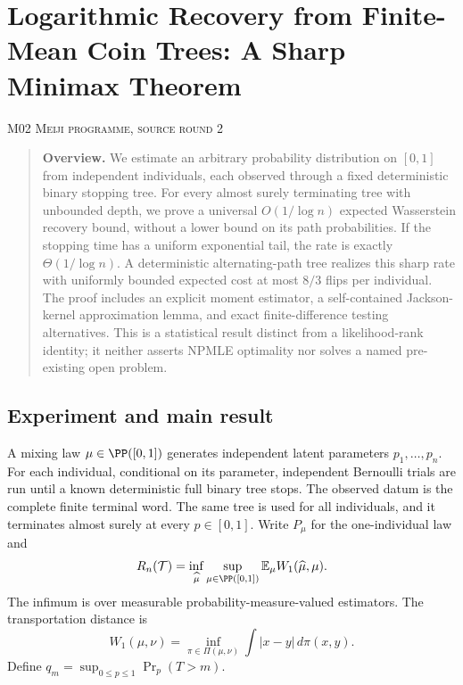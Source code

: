 \documentclass[11pt,a4paper]{article}
\theoremstyle{definition}\newtheorem{definition}[theorem]{Definition}
\theoremstyle{remark}\newtheorem{remark}[theorem]{Remark}
\newcommand{\E}{\mathbb E}\newcommand{\one}{\mathbf 1}\newcommand{\1}{\mathbf 1}
\numberwithin{equation}{section}
\begin{document}
\clearpage
\section[M02 --- Logarithmic Recovery from Finite-Mean Coin Trees: A Sharp Minimax Theorem]{Logarithmic Recovery from Finite-Mean Coin Trees: A Sharp Minimax Theorem}\label{contrib-M02}
\noindent\textsc{M02 \quad Meiji programme, source round 2}\par\medskip


\begin{quote}\small\textbf{Overview.} We estimate an arbitrary probability distribution on $[0,1]$ from independent individuals, each observed through a fixed deterministic binary stopping tree. For every almost surely terminating tree with unbounded depth, we prove a universal $O(1/\log n)$ expected Wasserstein recovery bound, without a lower bound on its path probabilities. If the stopping time has a uniform exponential tail, the rate is exactly $\Theta(1/\log n)$. A deterministic alternating-path tree realizes this sharp rate with uniformly bounded expected cost at most $8/3$ flips per individual. The proof includes an explicit moment estimator, a self-contained Jackson-kernel approximation lemma, and exact finite-difference testing alternatives. This is a statistical result distinct from a likelihood-rank identity; it neither asserts NPMLE optimality nor solves a named pre-existing open problem.\end{quote}

\subsection{Experiment and main result}\label{M02-sec-1}
A mixing law $\mu\in\PP([0,1])$ generates independent latent parameters $p_1,\ldots,p_n$. For each individual, conditional on its parameter, independent Bernoulli trials are run until a known deterministic full binary tree stops. The observed datum is the complete finite terminal word. The same tree is used for all individuals, and it terminates almost surely at every $p\in[0,1]$. Write $P_\mu$ for the one-individual law and
\[
 R_n(\mathcal T)=\inf_{\widehat\mu}\sup_{\mu\in\PP([0,1])}
 \E_\mu W_1(\widehat\mu,\mu).
\]
The infimum is over measurable probability-measure-valued estimators. The transportation distance is
\[
 W_1(\mu,\nu)=\inf_{\pi\in\Pi(\mu,\nu)}\int|x-y|\,d\pi(x,y).
\]
Define $q_m=\sup_{0\le p\le1}\Pr_p(T>m)$.
\end{document}
